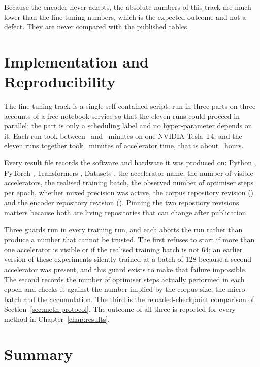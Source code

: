 Because the encoder never adapts, the absolute numbers of this track are much lower than the
fine-tuning numbers, which is the expected outcome and not a defect. They are never compared
with the published tables.

\section{Implementation and Reproducibility}
\label{sec:meth-impl}

The fine-tuning track is a single self-contained script, run in three parts on three accounts
of a free notebook service so that the eleven runs could proceed in parallel; the part is only
a scheduling label and no hyper-parameter depends on it. Each run took between \minAll\ and \maxAll\ minutes on one NVIDIA Tesla T4, and the eleven runs together took \totalMinutes\
minutes of accelerator time, that is about \totalHours\ hours.

Every result file records the software and hardware it was produced on: Python
\pythonVersion, PyTorch \torchVersion, Transformers \tfVersion, Datasets \datasetsVersion, the
accelerator name, the number of visible accelerators, the realised training batch, the observed
number of optimiser steps per epoch, whether mixed precision was active, the corpus repository
revision (\datasetSha) and the encoder repository revision (\modelSha). Pinning the two
repository revisions matters because both are living repositories that can change after
publication.

Three guards run in every training run, and each aborts the run rather than produce a number
that cannot be trusted. The first refuses to start if more than one accelerator is visible or
if the realised training batch is not 64; an earlier version of these experiments silently
trained at a batch of 128 because a second accelerator was present, and this guard exists to
make that failure impossible. The second records the number of optimiser steps actually
performed in each epoch and checks it against the number implied by the corpus size, the
micro-batch and the accumulation. The third is the reloaded-checkpoint comparison of
Section~\ref{sec:meth-protocol}. The outcome of all three is reported for every method in
Chapter~\ref{chap:results}.

\section{Summary}

